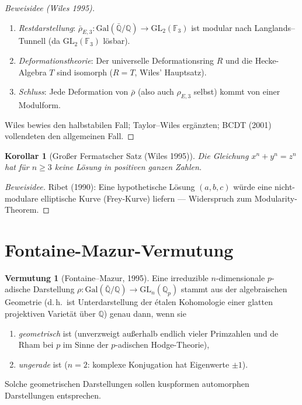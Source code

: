 \documentclass[12pt,a4paper]{amsart}
\newtheorem{corollary}[theorem]{Korollar}
\theoremstyle{definition}
\newtheorem{conjecture}[theorem]{Vermutung}
\newcommand{\Q}{\mathbb{Q}}
\newcommand{\F}{\mathbb{F}}
\newcommand{\GL}{\mathrm{GL}}
\newcommand{\GQ}{\mathrm{Gal}(\bar{\Q}/\Q)}
\begin{document}
\begin{proof}[Beweisidee (Wiles 1995)]
\begin{enumerate}[label=\arabic*.]
  \item \emph{Restdarstellung}: $\bar\rho_{E,3} : \GQ \to \GL_2(\F_3)$ ist
    modular nach Langlands--Tunnell (da $\GL_2(\F_3)$ lösbar).
  \item \emph{Deformationstheorie}: Der universelle Deformationsring $R$
    und die Hecke-Algebra $T$ sind isomorph ($R = T$, Wiles' Hauptsatz).
  \item \emph{Schluss}: Jede Deformation von $\bar\rho$ (also auch $\rho_{E,3}$
    selbst) kommt von einer Modulform.
\end{enumerate}
Wiles bewies den halbstabilen Fall; Taylor--Wiles ergänzten;
BCDT (2001) vollendeten den allgemeinen Fall.
\end{proof}

\begin{corollary}[Großer Fermatscher Satz (Wiles 1995)]
Die Gleichung $x^n + y^n = z^n$ hat für $n \ge 3$ keine Lösung in positiven
ganzen Zahlen.
\end{corollary}

\begin{proof}[Beweisidee]
Ribet (1990): Eine hypothetische Lösung $(a,b,c)$ würde eine nicht-modulare
elliptische Kurve (Frey-Kurve) liefern — Widerspruch zum Modularity-Theorem.
\end{proof}

\section{Fontaine-Mazur-Vermutung}

\begin{conjecture}[Fontaine--Mazur, 1995]
\label{conj:fontaine_mazur}
Eine irreduzible $n$-dimensionale $p$-adische Darstellung $\rho : \GQ \to \GL_n(\Q_p)$
stammt aus der algebraischen Geometrie (d.\,h.\ ist Unterdarstellung der étalen
Kohomologie einer glatten projektiven Varietät über $\Q$) genau dann, wenn sie
\begin{enumerate}[label=(\roman*)]
  \item \emph{geometrisch} ist (unverzweigt außerhalb endlich vieler Primzahlen und
    de Rham bei $p$ im Sinne der $p$-adischen Hodge-Theorie),
  \item \emph{ungerade} ist ($n=2$: komplexe Konjugation hat Eigenwerte $\pm 1$).
\end{enumerate}
Solche geometrischen Darstellungen sollen kuspformen automorphen Darstellungen
entsprechen.
\end{conjecture}
\end{document}
